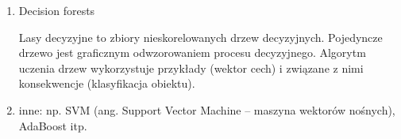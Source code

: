 \begin{enumerate}
\item Decision forests

Lasy decyzyjne to zbiory nieskorelowanych drzew decyzyjnych. 
Pojedyncze drzewo jest graficznym odwzorowaniem procesu decyzyjnego. 
Algorytm uczenia drzew wykorzystuje przykłady (wektor cech) i związane z nimi konsekwencje (klasyfikacja obiektu).


\item inne: np. SVM (ang. Support Vector Machine -- maszyna wektorów nośnych), AdaBoost itp.


\end{enumerate}



